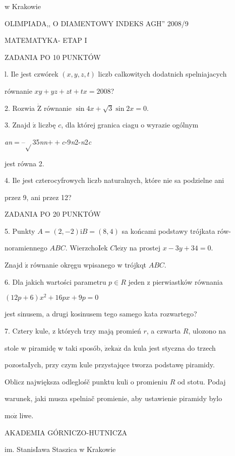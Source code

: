 \documentclass[a4paper,12pt]{article}
\begin{document}
w Krakowie

OLIMPIADA,, O DIAMENTOWY INDEKS AGH'' 2008/9

MATEMATYKA- ETAP I

ZADANIA PO 10 PUNKTÓW

l. Ile jest czwórek $(x,y,z,t)$ liczb calkowitych dodatnich spelniajacych

równanie $xy+yz+zt+tx=2008$?

2. Rozwia $\dot{\mathrm{Z}}$ równanie $\sin 4x+\sqrt{3}\sin 2x=0.$

3. Znajd $\acute{\mathrm{z}}$ liczbę $c$, dla której granica ciagu o wyrazie ogólnym

{\it an}$=$--$\sqrt{}$35{\it nn}$++${\it c}-9{\it n}2-{\it n}2{\it c}

jest równa 2.

4. Ile jest czterocyfrowych liczb naturalnych, które nie sa podzielne ani

przez 9, ani przez 12?

ZADANIA PO 20 PUNKTÓW

5. Punkty $A= (2,-2) \mathrm{i}B= (8,4)$ sa końcami podstawy trójkata rów-

noramiennego $ABC$. WierzchoIek $C\mathrm{l}\mathrm{e}\dot{\mathrm{z}}\mathrm{y}$ na prostej $x-3y+34=0.$

Znajd $\acute{\mathrm{z}}$ równanie okręgu wpisanego w trójkqt $ABC.$

6. Dla jakich wartości parametru $p\in R$ jeden z pierwiastków równania

$(12p+6)x^{2}+16px+9p=0$

jest sinusem, a drugi kosinusem tego samego kata rozwartego?

7. Cztery kule, z których trzy mają promień $r$, a czwarta $R$, ulozono na

stole w piramidę w taki sposób, $\dot{\mathrm{z}}\mathrm{e}\mathrm{k}\mathrm{a}\dot{\mathrm{z}}$ da kula jest styczna do trzech

pozostaIych, przy czym kule przystajqce tworza podstawę piramidy.

Oblicz największa odleglośč punktu kuli o promieniu $R$ od stotu. Podaj

warunek, jaki musza spelniač promienie, aby ustawienie piramidy bylo

$\mathrm{m}\mathrm{o}\dot{\mathrm{z}}$ liwe.






AKADEMIA GÓRNICZO-HUTNICZA

im. StanisIawa Staszica w Krakowie
\end{document}
